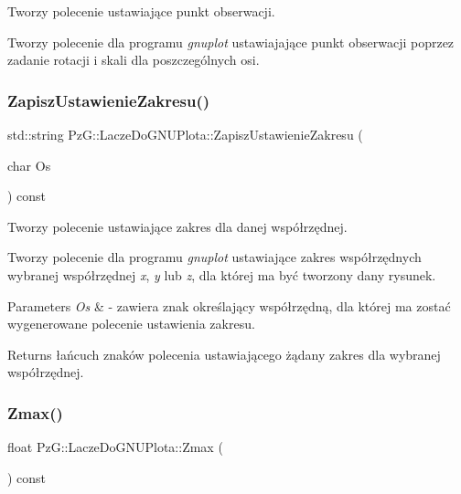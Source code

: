 Tworzy polecenie ustawiające punkt obserwacji. 

Tworzy polecenie dla programu {\itshape gnuplot} ustawiajające punkt obserwacji poprzez zadanie rotacji i skali dla poszczególnych osi. \mbox{\label{classPzG_1_1LaczeDoGNUPlota_a4579aecf7b4777fdde0cae4e98c275c2}} 
\subsubsection{\texorpdfstring{Zapisz\+Ustawienie\+Zakresu()}{ZapiszUstawienieZakresu()}}
{\footnotesize\ttfamily std\+::string Pz\+G\+::\+Lacze\+Do\+G\+N\+U\+Plota\+::\+Zapisz\+Ustawienie\+Zakresu (\begin{DoxyParamCaption}\item[{char}]{Os }\end{DoxyParamCaption}) const\hspace{0.3cm}{\ttfamily [protected]}}



Tworzy polecenie ustawiające zakres dla danej współrzędnej. 

Tworzy polecenie dla programu {\itshape gnuplot} ustawiające zakres współrzędnych wybranej współrzędnej {\itshape x}, {\itshape y} lub {\itshape z}, dla której ma być tworzony dany rysunek. 
\begin{DoxyParams}{Parameters}
{\em Os} & -\/ zawiera znak określający współrzędną, dla której ma zostać wygenerowane polecenie ustawienia zakresu. \\
\hline
\end{DoxyParams}
\begin{DoxyReturn}{Returns}
łańcuch znaków polecenia ustawiającego żądany zakres dla wybranej współrzędnej. 
\end{DoxyReturn}
\mbox{\label{classPzG_1_1LaczeDoGNUPlota_a20a5d03e1fc19c682032bffc54340f12}} 
\subsubsection{\texorpdfstring{Zmax()}{Zmax()}}
{\footnotesize\ttfamily float Pz\+G\+::\+Lacze\+Do\+G\+N\+U\+Plota\+::\+Zmax (\begin{DoxyParamCaption}{ }\end{DoxyParamCaption}) const\hspace{0.3cm}{\ttfamily [inline]}}

